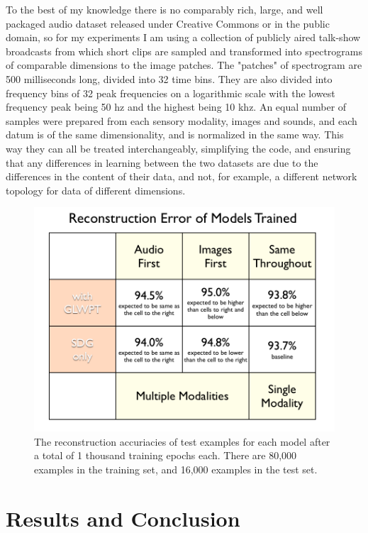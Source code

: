 \documentclass[12pt]{article}
\begin{document}
\begin{doublespacing}
	To the best of my knowledge there is no comparably rich, large, and well packaged audio dataset released under Creative Commons or in the public domain, so for my experiments I am using a collection of publicly aired talk-show broadcasts from which short clips are sampled and transformed into spectrograms of comparable dimensions to the image patches. The "patches" of spectrogram are 500 milliseconds long, divided into 32 time bins. They are also divided into frequency bins of 32 peak frequencies on a logarithmic scale with the lowest frequency peak being 50 hz and the highest being 10 khz. An equal number of samples were prepared from each sensory modality, images and sounds, and each datum is of the same dimensionality, and is normalized in the same way. This way they can all be treated interchangeably, simplifying the code, and ensuring that any differences in learning between the two datasets are due to the differences in the content of their data, and not, for example, a different network topology for data of different dimensions.
	
\begin{figure}[p]
\centering
\includegraphics[width=6in]{table_of_models}
\caption{The reconstruction accuriacies of test examples for each  model after a total of 1 thousand training epochs each. There are 80,000 examples in the training set, and 16,000 examples in the test set.}
\label{fig:table_of_models}
\end{figure}
	
\section{Results and Conclusion}

\end{doublespacing}
\end{document}
